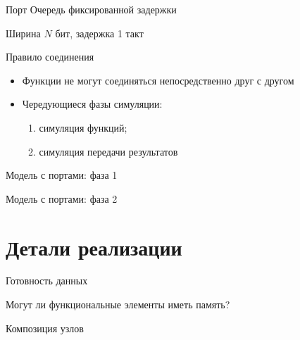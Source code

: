 \begin{frame}{Порт}
Очередь фиксированной задержки

Ширина $N$ бит, задержка 1 такт

\vfill
\centering
{}

\end{frame}

\begin{frame}{Правило соединения}

\begin{itemize}
\item Функции не могут соединяться непосредственно друг с другом
\item Чередующиеся фазы симуляции:
\begin{enumerate}
    \item симуляция функций;
    \item симуляция передачи результатов
\end{enumerate}
\end{itemize}
\end{frame}

\begin{frame}{Модель с портами: фаза 1}

\centering
{}

\end{frame}

\begin{frame}{Модель с портами: фаза 2}

\centering
{}

\end{frame}


\section{Детали реализации}

\begin{frame}{Готовность данных}

\centering
{}

\end{frame}

\begin{frame}{Могут ли функциональные элементы иметь память?}

\centering
{}

\end{frame}

\begin{frame}{Композиция узлов}

\centering
{}

\end{frame}

